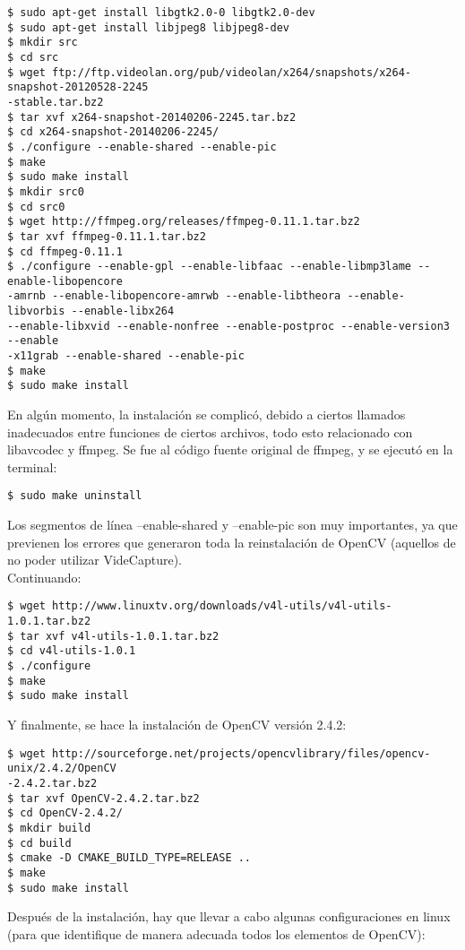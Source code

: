 \documentclass[letter]{article}
\begin{document}
\begin{lstlisting}
$ sudo apt-get install libgtk2.0-0 libgtk2.0-dev
$ sudo apt-get install libjpeg8 libjpeg8-dev
$ mkdir src
$ cd src
$ wget ftp://ftp.videolan.org/pub/videolan/x264/snapshots/x264-snapshot-20120528-2245
-stable.tar.bz2
$ tar xvf x264-snapshot-20140206-2245.tar.bz2
$ cd x264-snapshot-20140206-2245/
$ ./configure --enable-shared --enable-pic
$ make
$ sudo make install
$ mkdir src0
$ cd src0
$ wget http://ffmpeg.org/releases/ffmpeg-0.11.1.tar.bz2
$ tar xvf ffmpeg-0.11.1.tar.bz2
$ cd ffmpeg-0.11.1
$ ./configure --enable-gpl --enable-libfaac --enable-libmp3lame --enable-libopencore
-amrnb --enable-libopencore-amrwb --enable-libtheora --enable-libvorbis --enable-libx264
--enable-libxvid --enable-nonfree --enable-postproc --enable-version3 --enable
-x11grab --enable-shared --enable-pic
$ make
$ sudo make install
\end{lstlisting}

En algún momento, la instalación se complicó, debido a ciertos llamados inadecuados entre funciones de ciertos archivos, todo esto relacionado con libavcodec y ffmpeg. Se fue al código fuente original de ffmpeg, y se ejecutó en la terminal:

\begin{lstlisting}
$ sudo make uninstall
\end{lstlisting}

Los segmentos de línea --enable-shared y --enable-pic son muy importantes, ya que previenen los errores que generaron toda la reinstalación de OpenCV (aquellos de no poder utilizar VideCapture).\\
Continuando:

\begin{lstlisting}
$ wget http://www.linuxtv.org/downloads/v4l-utils/v4l-utils-1.0.1.tar.bz2
$ tar xvf v4l-utils-1.0.1.tar.bz2
$ cd v4l-utils-1.0.1
$ ./configure
$ make
$ sudo make install
\end{lstlisting}

Y finalmente, se hace la instalación de OpenCV versión 2.4.2:

\begin{lstlisting}
$ wget http://sourceforge.net/projects/opencvlibrary/files/opencv-unix/2.4.2/OpenCV
-2.4.2.tar.bz2
$ tar xvf OpenCV-2.4.2.tar.bz2
$ cd OpenCV-2.4.2/
$ mkdir build
$ cd build
$ cmake -D CMAKE_BUILD_TYPE=RELEASE ..
$ make
$ sudo make install
\end{lstlisting}

Después de la instalación, hay que llevar a cabo algunas configuraciones en linux (para que identifique de manera adecuada todos los elementos de OpenCV):
\end{document}
